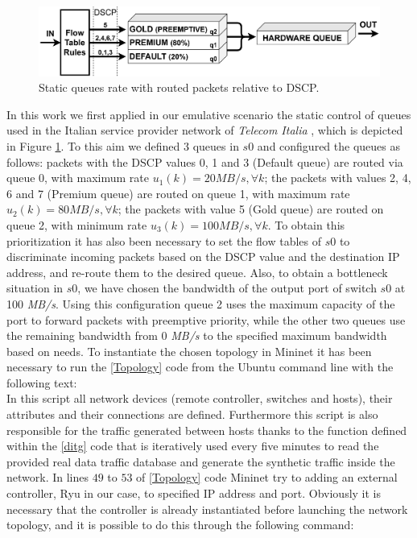 \begin{figure}[tb!]
	\centering
	\includegraphics[keepaspectratio,width=\columnwidth]{figure/QUEUE.eps}
	\caption{Static queues rate with routed packets relative to DSCP.}
	\label{fig:{queue}}
\end{figure}

In this work we first applied in our emulative scenario the static control of queues used in the Italian service provider network of \textit{Telecom Italia} \cite{Notiziario}, which is depicted in Figure \ref{fig:{queue}}. To this aim we defined 3 queues in $s0$ and configured the queues as follows: packets with the DSCP values 0, 1 and 3 (Default queue) are routed via queue 0, with maximum rate $u_1(k) = 20 \textit{MB/s}, \forall k$; the packets with values 2, 4, 6 and 7 (Premium queue) are routed on queue 1, with maximum rate $u_2(k) = 80 \textit{MB/s}, \forall k$; the packets with value 5 (Gold queue) are routed on queue 2, with minimum rate $u_3(k) = 100 \textit{MB/s}, \forall k$. To obtain this prioritization it has also been necessary to set the flow tables of $s0$ to discriminate incoming packets based on the DSCP value and the destination IP address, and re-route them to the desired queue. Also, to obtain a bottleneck situation in $s0$, we have chosen the bandwidth of the output port of switch $s0$ at 100 \textit{MB/s}. Using this configuration queue 2 uses the maximum capacity of the port to forward packets with preemptive priority, while the other two queues use the remaining bandwidth from 0 \textit{MB/s} to the specified maximum bandwidth based on needs.
To instantiate the chosen topology in Mininet it has been necessary to run the \ref{Topology} code from the Ubuntu command line with the following text:\\
In this script all network devices (remote controller, switches and hosts), their attributes and their connections are defined. Furthermore this script is also responsible for the traffic generated between hosts thanks to the function defined within the \ref{ditg} code that is iteratively used every five minutes to read the provided real data traffic database and generate the synthetic traffic inside the network. In lines $49$ to $53$ of \ref{Topology} code Mininet try to adding an external controller, Ryu in our case, to specified IP address and port. Obviously it is necessary that the controller is already instantiated before launching the network topology, and it is possible to do this through the following command:
